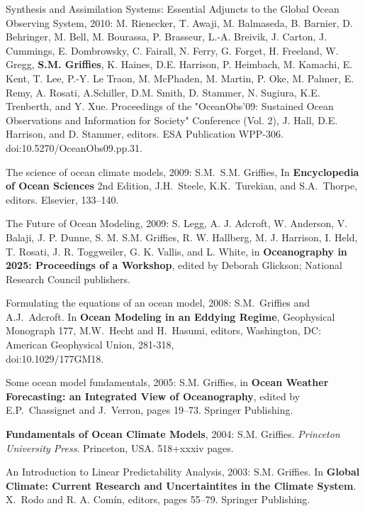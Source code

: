 \begin{etaremune}
\item Synthesis and Assimilation Systems: Essential Adjuncts to the
  Global Ocean Observing System, 2010: M. Rienecker, T. Awaji,
  M. Balmaseda, B. Barnier, D. Behringer, M. Bell, M. Bourassa,
  P. Brasseur, L.-A. Breivik, J. Carton, J. Cummings, E. Dombrowsky,
  C. Fairall, N. Ferry, G. Forget, H. Freeland, W. Gregg, {\bf
    S.M. Grif\/f\/ies}, K. Haines, D.E. Harrison, P. Heimbach,
  M. Kamachi, E. Kent, T. Lee, P.-Y. {Le Traon}, M. McPhaden,
  M. Martin, P. Oke, M. Palmer, E. Remy, A. Rosati, A.Schiller,
  D.M. Smith, D. Stammer, N. Sugiura, K.E. Trenberth, and Y. Xue.
  Proceedings of the "OceanObs’09: Sustained Ocean Observations and
  Information for Society" Conference (Vol. 2), J. Hall,
  D.E. Harrison, and D. Stammer, editors. ESA Publication WPP-306.
  doi:10.5270/OceanObs09.pp.31.

\item The science of ocean climate models, 2009: S.M.\ S.M. Grif\/f\/ies,  In {\bf Encyclopedia of Ocean Sciences} 2nd Edition,  J.H.\ Steele, K.K.\ Turekian, and S.A.\ Thorpe, editors. Elsevier, 133--140.

\item The Future of Ocean Modeling, 2009: S. Legg, A. J. Adcroft, W.   Anderson, V. Balaji, J. P. Dunne, S. M. S.M. Grif\/f\/ies, R. W. Hallberg, M. J. Harrison, I. Held, T. Rosati, J. R. Toggweiler, G. K. Vallis, and L.  White, in {\bf Oceanography in 2025: Proceedings of a Workshop}, edited by Deborah Glickson; National Research Council publishers.  

\item Formulating the equations of an ocean model, 2008: S.M.\ Grif\/f\/ies and A.J.\ Adcroft. In {\bf Ocean Modeling in an Eddying Regime}, Geophysical Monograph 177, M.W.\ Hecht and H.\ Hasumi, editors, Washington, DC: American Geophysical Union, 281-318, \\ doi:10.1029/177GM18. 

\item Some ocean model fundamentals, 2005: S.M. Grif\/f\/ies, in {\bf Ocean Weather Forecasting: an Integrated View of Oceanography}, edited
by E.P.\ Chassignet and J.\ Verron, pages 19--73.  Springer Publishing.

\item {\bf Fundamentals of Ocean Climate Models}, 2004: S.M. Grif\/f\/ies. {\em Princeton University Press}. Princeton, USA.  518+xxxiv pages.

\item An Introduction to Linear Predictability Analysis, 2003: S.M. Grif\/f\/ies.  In {\bf Global Climate: Current Research and Uncertaintites in the Climate System}. X.\ Rodo and R. A. Com\'in, editors, pages 55--79.  Springer Publishing.


\end{etaremune}
